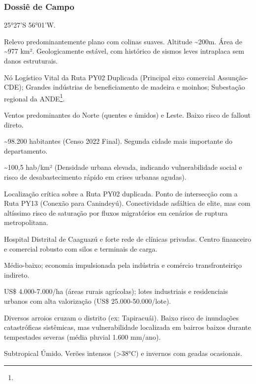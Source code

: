 \subsubsection{Dossiê de Campo}
\begin{description}[style=nextline,leftmargin=0.5cm,font=\bfseries]
\item[Coordenadas]  25°27'S 56°01'W.
\item[Topografia]  Relevo predominantemente plano com colinas suaves. Altitude \textasciitilde 200m. Área de \textasciitilde 977 km². Geologicamente estável, com histórico de sismos leves intraplaca sem danos estruturais.
\item[Alvos Estratégicos]  Nó Logístico Vital da Ruta PY02 Duplicada (Principal eixo comercial Assunção-CDE); Grandes indústrias de beneficiamento de madeira e moinhos; Subestação regional da ANDE\footnote{\fineANDE}.
\item[Fallout]  Ventos predominantes do Norte (quentes e úmidos) e Leste. Baixo risco de fallout direto.
\item[População]  \textasciitilde 98.200 habitantes (Censo 2022 Final). Segunda cidade mais importante do departamento.
\item[Densidade]  \textasciitilde 100,5 hab/\allowbreak km² (Densidade urbana elevada, indicando vulnerabilidade social e risco de desabastecimento rápido em crises urbanas agudas).
\item[Vias de Acesso]  Localização crítica sobre a Ruta PY02 duplicada. Ponto de intersecção com a Ruta PY13 (Conexão para Canindeyú). Conectividade asfáltica de elite, mas com altíssimo risco de saturação por fluxos migratórios em cenários de ruptura metropolitana.
\item[Serviços]  Hospital Distrital de Caaguazú e forte rede de clínicas privadas. Centro financeiro e comercial robusto com silos e terminais de carga.
\item[Custo de Vida]  Médio-baixo; economia impulsionada pela indústria e comércio transfronteiriço indireto.
\item[Preço da Terra]  US\$ 4.000-7.000/\allowbreak ha (áreas rurais agrícolas); lotes industriais e residenciais urbanos com alta valorização (US\$ 25.000-50.000/\allowbreak lote).
\item[Hidrologia]  Diversos arroios cruzam o distrito (ex: Tapiracuái). Baixo risco de inundações catastróficas sistêmicas, mas vulnerabilidade localizada em bairros baixos durante tempestades severas (média pluvial 1.600 mm/\allowbreak ano).
\item[Clima]  Subtropical Úmido. Verões intensos (>38°C) e invernos com geadas ocasionais.

\end{description}
